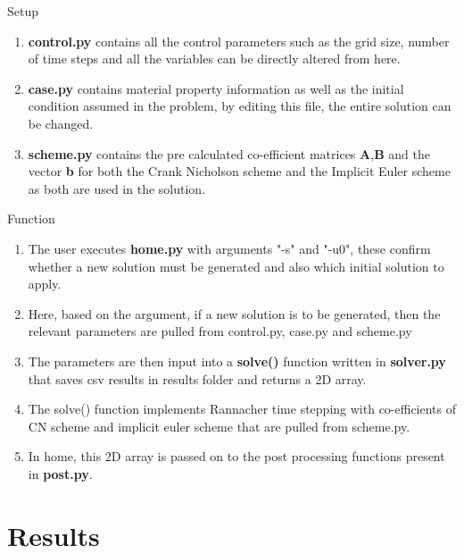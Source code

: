 \documentclass[10pt,compress]{beamer}
\begin{document}
\begin{frame}{Setup}
\begin{enumerate}
	\item \textbf{control.py} contains all the control parameters such as the grid size, number of time steps and all the variables can be directly altered from here.
	\item \textbf{case.py} contains material property  information as well as the initial condition assumed in the problem, by editing this file, the entire solution can be changed.
	\item \textbf{scheme.py} contains the pre calculated co-efficient matrices \textbf{A},\textbf{B} and the vector \textbf{b} for both the Crank Nicholson scheme and the Implicit Euler scheme as both are used in the solution. 
\end{enumerate}
\end{frame}

\begin{frame}{Function}
\begin{enumerate}
\item The user executes \textbf{home.py} with arguments "-s" and "-u0", these confirm whether a new solution must be generated and also which initial solution to apply. 
\item Here, based on the argument, if a new solution is to be generated, then the relevant parameters are pulled from control.py, case.py and scheme.py
\item The parameters are then input into a \textbf{solve()} function written in \textbf{solver.py} that saves csv results in results folder and returns a 2D array.
\item The solve() function implements Rannacher time stepping with co-efficients of CN scheme and implicit euler scheme that are pulled from scheme.py.
\item In home, this 2D array is passed on to the post processing functions present in \textbf{post.py}.
\end{enumerate}
\end{frame}

\section{Results}
\end{document}
